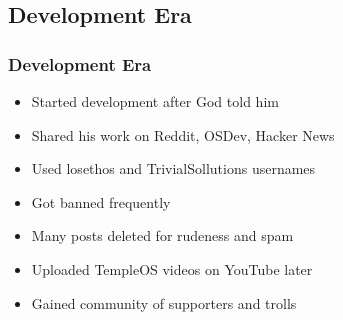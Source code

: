 \documentclass{beamer}
\begin{document}
	\subsection{Development Era}
	\begin{frame}
		\frametitle{Development Era}
		\begin{itemize}
			\item Started development after God told him

			\item Shared his work on Reddit, OSDev, Hacker News

			\item Used losethos and TrivialSollutions usernames

			\item Got banned frequently

			\item Many posts deleted for rudeness and spam

			\item Uploaded TempleOS videos on YouTube later

			\item Gained community of supporters and trolls
		\end{itemize}
	\end{frame}
\end{document}
